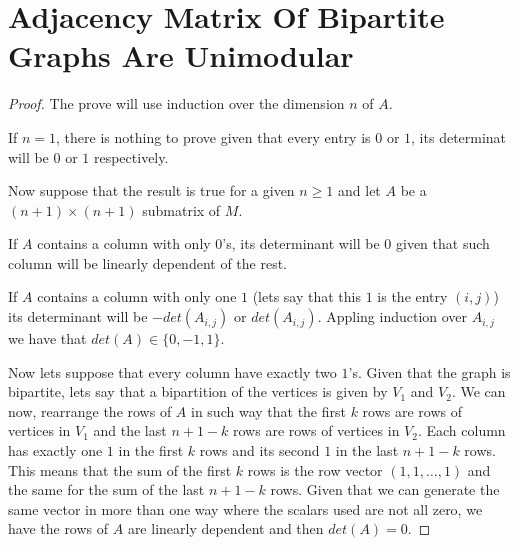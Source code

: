 ﻿\chapter{Adjacency Matrix Of Bipartite Graphs Are Unimodular}
\label{AdjacencyMatrixOfBipartiteGraphsAreUnimodular}

\begin{proof}
    The prove will use induction over the dimension $n$ of $A$.\pn

    If $n = 1$, there is nothing to prove given that every entry is $0$ or $1$, its determinat
    will be $0$ or $1$ respectively.\pn

    Now suppose that the result is true for a given $n \geq 1$ and let $A$ be a $(n+1) \times (n+1)$
    submatrix of $M$.\pn

    If $A$ contains a column with only $0$'s, its determinant will be $0$ given that such column
    will be linearly dependent of the rest.\pn

    If $A$ contains a column with only one $1$ (lets say that this $1$ is the entry $(i,j)$)
    its determinant will be $-det(A_{i,j})$ or $det(A_{i,j})$. Appling induction over $A_{i,j}$
    we have that $det(A) \in \{0, -1, 1\}$.\pn

    Now lets suppose that every column have exactly two $1$'s. Given that the graph is bipartite, 
    lets say that a bipartition of the vertices is given by $V_1$ and $V_2$. We can now, rearrange
    the rows of $A$ in such way that the first $k$ rows are rows of vertices in $V_1$ and the last
    $n+1-k$ rows are rows of vertices in $V_2$. Each column has exactly one $1$ in the first $k$ rows
    and its second $1$ in the last $n+1-k$ rows. This means that the sum of the first $k$ rows is
    the row vector $(1, 1, \dots, 1)$ and the same for the sum of the last $n+1-k$ rows. Given that
    we can generate the same vector in more than one way where the scalars used are not all zero,
    we have the rows of $A$ are linearly dependent and then $det(A) = 0$.
\end{proof}